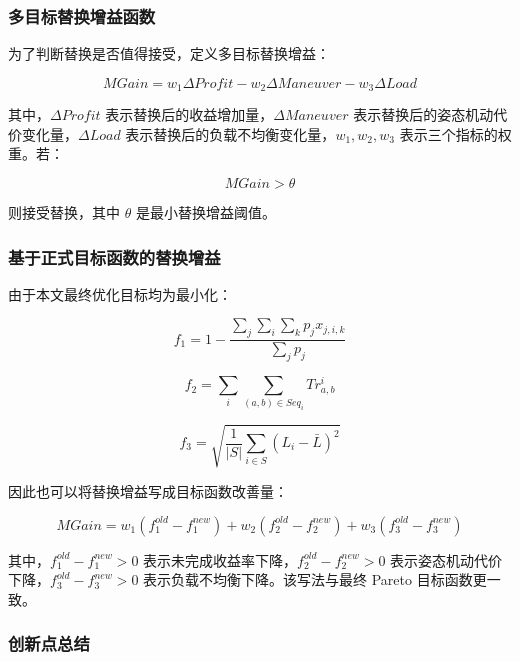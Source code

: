 \documentclass[UTF8,a4paper,12pt]{ctexart}
\begin{document}
\subsubsection{多目标替换增益函数}

为了判断替换是否值得接受，定义多目标替换增益：

\begin{equation}
MGain
=
w_1\Delta Profit
-
w_2\Delta Maneuver
-
w_3\Delta Load
\end{equation}

其中，$\Delta Profit$ 表示替换后的收益增加量，$\Delta Maneuver$ 表示替换后的姿态机动代价变化量，$\Delta Load$ 表示替换后的负载不均衡变化量，$w_1,w_2,w_3$ 表示三个指标的权重。若：

\begin{equation}
MGain>\theta
\end{equation}

则接受替换，其中 $\theta$ 是最小替换增益阈值。

\subsubsection{基于正式目标函数的替换增益}

由于本文最终优化目标均为最小化：

\begin{equation}
f_1=1-\frac{\sum_j\sum_i\sum_k p_jx_{j,i,k}}{\sum_jp_j}
\end{equation}

\begin{equation}
f_2=\sum_i\sum_{(a,b)\in Seq_i}Tr_{a,b}^{i}
\end{equation}

\begin{equation}
f_3=\sqrt{\frac{1}{|S|}\sum_{i\in S}(L_i-\bar{L})^2}
\end{equation}

因此也可以将替换增益写成目标函数改善量：

\begin{equation}
MGain
=
w_1(f_1^{old}-f_1^{new})
+
w_2(f_2^{old}-f_2^{new})
+
w_3(f_3^{old}-f_3^{new})
\end{equation}

其中，$f_1^{old}-f_1^{new}>0$ 表示未完成收益率下降，$f_2^{old}-f_2^{new}>0$ 表示姿态机动代价下降，$f_3^{old}-f_3^{new}>0$ 表示负载不均衡下降。该写法与最终 Pareto 目标函数更一致。

\subsubsection{创新点总结}
\end{document}

